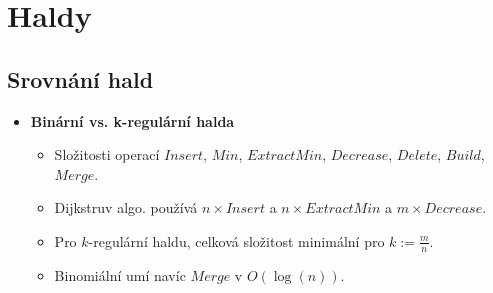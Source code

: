 \documentclass[11pt,a4paper]{article}
\begin{document}
\section{Haldy}
\subsection{Srovnání hald}
\begin{itemize}
    \item \textbf{Binární vs. k-regulární halda}
    \begin{itemize}
        \item Složitosti operací $Insert$, $Min$, $ExtractMin$, $Decrease$, $Delete$, $Build$, $Merge$.
        \item Dijkstruv algo. používá $n \times Insert$ a $n \times ExtractMin$ a $m \times Decrease$.
        \item Pro $k$-regulární haldu, celková složitost minimální pro $k := \frac{m}{n}$.
        \item Binomiální umí navíc $Merge$ v $O(\log(n))$.
    \end{itemize}
\end{itemize}
\end{document}
